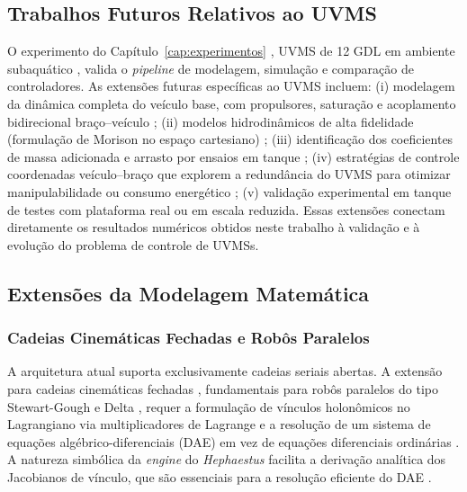 \subsection{Trabalhos Futuros Relativos ao UVMS}

O experimento do Capítulo~\ref{cap:experimentos} , UVMS de 12 GDL em ambiente subaquático , valida o \textit{pipeline} de modelagem, simulação e comparação de controladores. As extensões futuras específicas ao UVMS incluem: (i) modelagem da dinâmica completa do veículo base, com propulsores, saturação e acoplamento bidirecional braço--veículo \cite{fossen2011handbook, antonelli2014modelling}; (ii) modelos hidrodinâmicos de alta fidelidade (formulação de Morison no espaço cartesiano) \cite{newman1977marine}; (iii) identificação dos coeficientes de massa adicionada e arrasto por ensaios em tanque \cite{aldhaheri2022underwater}; (iv) estratégias de controle coordenadas veículo--braço que explorem a redundância do UVMS para otimizar manipulabilidade ou consumo energético \cite{yuh2001underwater}; (v) validação experimental em tanque de testes com plataforma real ou em escala reduzida. Essas extensões conectam diretamente os resultados numéricos obtidos neste trabalho à validação e à evolução do problema de controle de UVMSs.

\subsection{Extensões da Modelagem Matemática}

\subsubsection*{Cadeias Cinemáticas Fechadas e Robôs Paralelos}

A arquitetura atual suporta exclusivamente cadeias seriais abertas. A extensão para cadeias cinemáticas fechadas , fundamentais para robôs paralelos do tipo Stewart-Gough \cite{siciliano2009robotics} e Delta \cite{spong2020robot} , requer a formulação de vínculos holonômicos no Lagrangiano via multiplicadores de Lagrange e a resolução de um sistema de equações algébrico-diferenciais (DAE) em vez de equações diferenciais ordinárias \cite{leimkuhler2004simulating}. A natureza simbólica da \textit{engine} do \textit{Hephaestus} facilita a derivação analítica dos Jacobianos de vínculo, que são essenciais para a resolução eficiente do DAE \cite{hairer2006geometric}.

